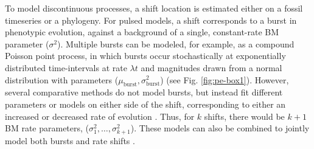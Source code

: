 	To model discontinuous processes, a shift location is estimated either on a fossil timeseries or a phylogeny. For pulsed models, a shift corresponds to a burst in phenotypic evolution, against a background of a single, constant-rate BM parameter ($\sigma^2$). Multiple bursts can be modeled, for example, as a compound Poisson point process, in which bursts occur stochastically at exponentially distributed time-intervals at rate $\lambda t$ and magnitudes drawn from a normal distribution with parameters ($\mu_{\text{burst}},  \sigma^2_{\text{burst}}$) (see Fig. \ref{fig:pe-box1}). However, several comparative methods do not model bursts, but instead fit different parameters or models on either side of the shift, corresponding to either an increased or decreased rate of evolution \citep{Omeara2006, Hunt2008, Eastman2011}. Thus, for $k$ shifts, there would be $k+\text{1}$ BM rate parameters, (${\sigma^2_{\text{1}},\ldots,\sigma^2_{k+\text{1}}}$). These models can also be combined to jointly model both bursts and rate shifts \citep{Eastmanjump}.

